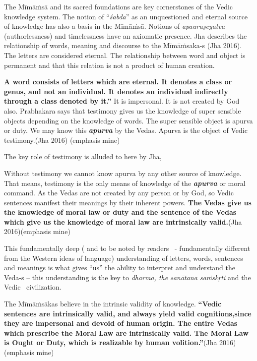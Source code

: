 The Mīmāṁsā and its sacred foundations are key cornerstones of the Vedic knowledge system. The notion of “\textit{śabda}” as an unquestioned and eternal source of knowledge has also a basis in the Mīmāṁsā. Notions of \textit{apauruṣeyatva} (authorlessness) and timelessness have an axiomatic presence. Jha describes the relationship of words, meaning and discourse to the Mīmāṁsaka-s (Jha 2016). The letters are considered eternal. The relationship between word and object is permanent and that this relation is not a product of human creation.

\newpage

\begin{myquote}
\textbf{A word consists of letters which are eternal. It denotes a class or genus, and not an individual. It denotes an individual indirectly through a class denoted by it.”} It is impersonal. It is not created by God also. Prabhakara says that testimony gives us the knowledge of super sensible objects depending on the knowledge of words. The super sensible object is apurva or duty. We may know this \textbf{\textit{apurva}} by the Vedas. Apurva is the object of Vedic testimony.\hfill (Jha 2016) (emphasis mine)
\end{myquote}

The key role of testimony is alluded to here by Jha,

\begin{myquote}
Without testimony we cannot know apurva by any other source of knowledge. That means, testimony is the only means of knowledge of the \textbf{\textit{apurva}} or moral command. As the Vedas are not created by any person or by God, so Vedic sentences manifest their meanings by their inherent powers. \textbf{The Vedas give us the knowledge of moral law or duty and the sentence of the Vedas which give us the knowledge of moral law are intrinsically valid.}\hfill (Jha 2016)(emphasis mine)
\end{myquote}

This fundamentally deep ( and to be noted by readers  - fundamentally different from the Western ideas of language) understanding of letters, words, sentences and meanings is what gives “us” the ability to interpret and understand the Veda-s – this understanding is the key to \textit{dharma, the sanātana saṁskṛti} and the Vedic  civilization.

\begin{myquote}
The Mīmāṁsākas believe in the intrinsic validity of knowledge. \textbf{“Vedic sentences are intrinsically valid, and always yield valid cognitions,since they are impersonal and devoid of human origin. The entire Vedas which prescribe the Moral Law are intrinsically valid. The Moral Law is Ought or Duty, which is realizable by human volition.”}\hfill (Jha 2016) (emphasis mine)
\end{myquote}


